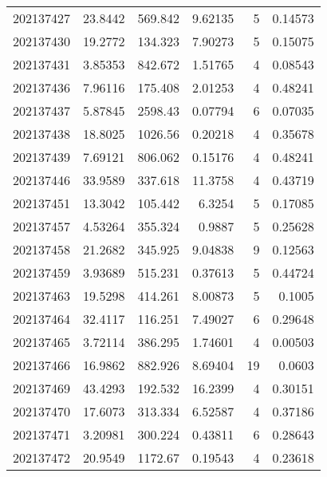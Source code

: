 \begin{tabular}{rrrrrr}
 202137427 &         23.8442  &      569.842  &            9.62135 &           5 & 0.14573 \\
 202137430 &         19.2772  &      134.323  &            7.90273 &           5 & 0.15075 \\
 202137431 &          3.85353 &      842.672  &            1.51765 &           4 & 0.08543 \\
 202137436 &          7.96116 &      175.408  &            2.01253 &           4 & 0.48241 \\
 202137437 &          5.87845 &     2598.43   &            0.07794 &           6 & 0.07035 \\
 202137438 &         18.8025  &     1026.56   &            0.20218 &           4 & 0.35678 \\
 202137439 &          7.69121 &      806.062  &            0.15176 &           4 & 0.48241 \\
 202137446 &         33.9589  &      337.618  &           11.3758  &           4 & 0.43719 \\
 202137451 &         13.3042  &      105.442  &            6.3254  &           5 & 0.17085 \\
 202137457 &          4.53264 &      355.324  &            0.9887  &           5 & 0.25628 \\
 202137458 &         21.2682  &      345.925  &            9.04838 &           9 & 0.12563 \\
 202137459 &          3.93689 &      515.231  &            0.37613 &           5 & 0.44724 \\
 202137463 &         19.5298  &      414.261  &            8.00873 &           5 & 0.1005  \\
 202137464 &         32.4117  &      116.251  &            7.49027 &           6 & 0.29648 \\
 202137465 &          3.72114 &      386.295  &            1.74601 &           4 & 0.00503 \\
 202137466 &         16.9862  &      882.926  &            8.69404 &          19 & 0.0603  \\
 202137469 &         43.4293  &      192.532  &           16.2399  &           4 & 0.30151 \\
 202137470 &         17.6073  &      313.334  &            6.52587 &           4 & 0.37186 \\
 202137471 &          3.20981 &      300.224  &            0.43811 &           6 & 0.28643 \\
 202137472 &         20.9549  &     1172.67   &            0.19543 &           4 & 0.23618 \\

\end{tabular}
